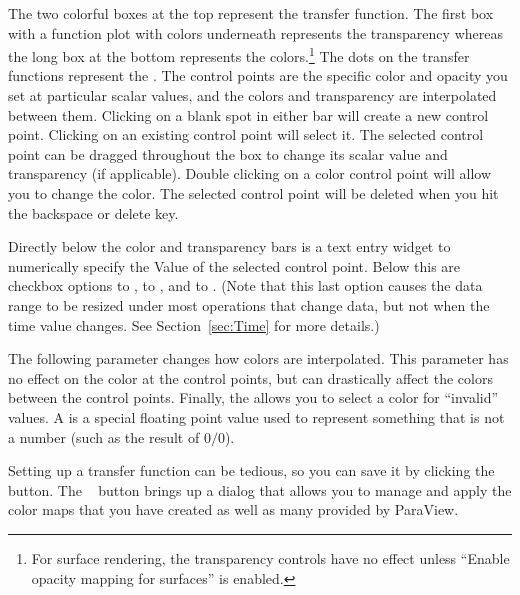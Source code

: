 The two colorful boxes at the top represent the transfer function. The
first box with a function plot with colors underneath represents the
transparency whereas the long box at the bottom represents the
colors.\footnote{For surface rendering, the transparency controls have no
  effect unless ``Enable opacity mapping for surfaces'' is enabled.} The
dots on the transfer functions represent the . The
control points are the specific color and opacity you set at
particular scalar values, and the colors and transparency are interpolated
between them. Clicking on a blank spot in either bar will create a new
control point. Clicking on an existing control point will select it. The
selected control point can be dragged throughout the box to change its
scalar value and transparency (if applicable). Double clicking on a color
control point will allow you to change the color. The selected control
point will be deleted when you hit the backspace or delete key.

Directly below the color and transparency bars is a text entry widget to
numerically specify the  Value of the selected control
point. Below this are checkbox options to , to , and to . (Note that this last option causes the data range
to be resized under most operations that change data, but not when the time
value changes. See Section~\ref{sec:Time} for more details.)

The following  parameter changes how
colors are interpolated. This parameter has no effect on the color at the
control points, but can drastically affect the colors between the control
points. Finally, the  allows you to select a
color for ``invalid'' values. A  is a special floating point
value used to represent something that is not a number (such as the result
of $0/0$).

Setting up a transfer function can be tedious, so you can save it by
clicking the ~ button.  The ~ button brings up a dialog that allows you to
manage and apply the color maps that you have created as well as many
provided by ParaView.

